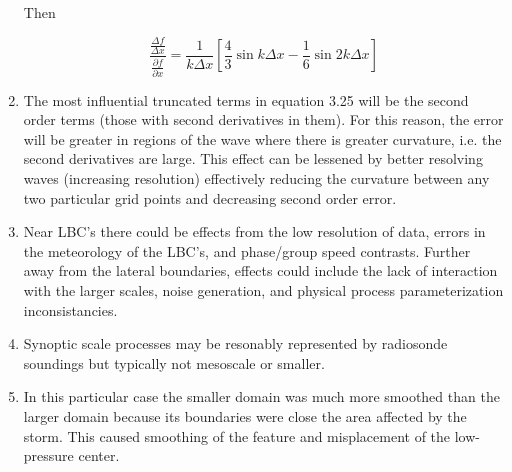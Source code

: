 \documentclass[11pt]{article}
\begin{document}
\begin{enumerate}
Then 

$$
\boxed{\frac{\frac{\Delta f}{\Delta x}}{\frac{\partial f}{\partial x}} = \frac{1}{k\Delta x}\left[\frac{4}{3}\sin{k\Delta x}- \frac{1}{6}\sin{2k\Delta x}\right]}
$$

\item
The most influential truncated terms in equation 3.25 will be the second order terms (those with second derivatives in them).  For this reason, the error will be greater in regions of the wave where there is greater curvature, i.e. the second derivatives are large. This effect can be lessened by better resolving waves (increasing resolution) effectively reducing the curvature between any two particular grid points and decreasing second order error. 

\setcounter{enumi}{6}
\item
Near LBC's there could be effects from the low resolution of data, errors in the meteorology of the LBC's, and phase/group speed contrasts. Further away from the lateral boundaries, effects could include the lack of interaction with the larger scales, noise generation, and physical process parameterization inconsistancies. 

\item
Synoptic scale processes may be resonably represented by radiosonde soundings but typically not mesoscale or smaller.

\item 
In this particular case the smaller domain was much more smoothed than the larger domain because its boundaries were close the area affected by the storm.  This caused smoothing of the feature and misplacement of the low-pressure center. 


\end{enumerate}
\end{document}
